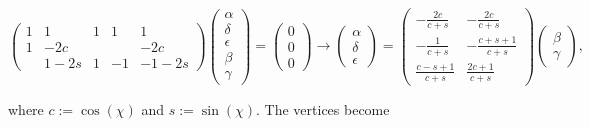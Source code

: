 			\begin{equation}
				\begin{pmatrix}
					1 & 1 & 1 & 1 & 1\\
					1 & -2c &  &  & -2c\\
					 & 1-2s & 1 & -1 & -1-2s
				\end{pmatrix}
				\begin{pmatrix}
					\alpha\\
					\delta\\
					\epsilon\\
					\beta\\
					\gamma
				\end{pmatrix}
				=\begin{pmatrix}
					0\\
					0\\
					0
				\end{pmatrix}
				\rightarrow
				\begin{pmatrix}
					\alpha\\
					\delta\\
					\epsilon
				\end{pmatrix}
				=
				\begin{pmatrix}
					-\frac{2c}{c+s} & -\frac{2c}{c+s}\\
					-\frac{1}{c+s} & -\frac{c+s+1}{c+s}\\
					 \frac{c-s+1}{c+s} & \frac{2c+1}{c+s}
				\end{pmatrix}
				\begin{pmatrix}
					\beta\\
					\gamma
				\end{pmatrix},
				\label{eq:modsys}
			\end{equation}
			
			where $c:=\cos(\chi)$ and $s:=\sin(\chi)$. The vertices become
			
